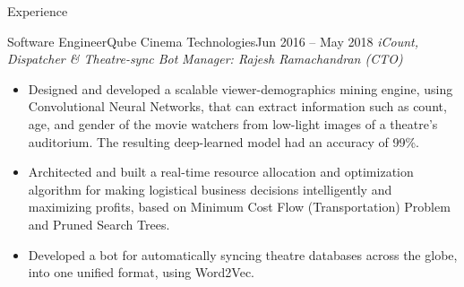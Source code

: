\documentclass[]{mcdowellcv}
\begin{document}
	\begin{cvsection}{Experience}
		\begin{cvsubsection}{Software Engineer}{Qube Cinema Technologies}{Jun 2016 – May 2018}
			\textit{iCount, Dispatcher \& Theatre-sync Bot} \hfill \textit{Manager: Rajesh Ramachandran (CTO)}
			\begin{itemize}
            \item Designed and developed a scalable viewer-demographics mining engine, using Convolutional Neural Networks, that can extract information such as count, age, and gender of the movie watchers from low-light images of a theatre's auditorium. The resulting deep-learned model had an accuracy of 99\%.
            \item Architected and built a real-time resource allocation and optimization algorithm for making logistical business decisions intelligently and maximizing profits, based on Minimum Cost Flow (Transportation) Problem and Pruned Search Trees.
            \item Developed a bot for automatically syncing theatre databases across the globe, into one unified format, using Word2Vec.
			\end{itemize}
		\end{cvsubsection}



\end{cvsection}
\end{document}

